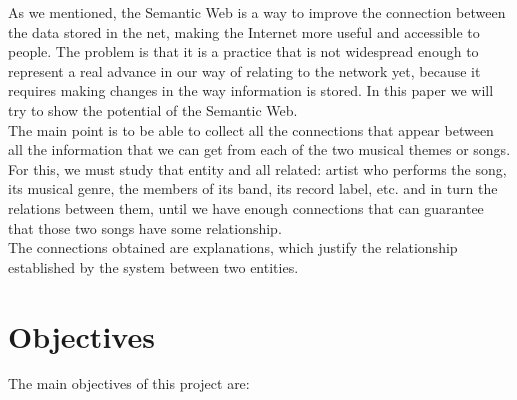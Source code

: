 As we mentioned, the Semantic Web is a way to improve the connection between the data stored in the net, making the Internet more useful and accessible to people. The problem is that it is a practice that is not widespread enough to represent a real advance in our way of relating to the network yet, because it requires making changes in the way information is stored. In this paper we will try to show the potential of the Semantic Web.\\

The main point is to be able to collect all the connections that appear between all the information that we can get from each of the two musical themes or songs. For this, we must study that entity and all related: artist who performs the song, its musical genre, the members of its band, its record label, etc. and in turn the relations between them, until we have enough connections that can guarantee that those two songs have some relationship.\\

The connections obtained are explanations, which justify the relationship established by the system between two entities.\\

\section{Objectives}

The main objectives of this project are:

